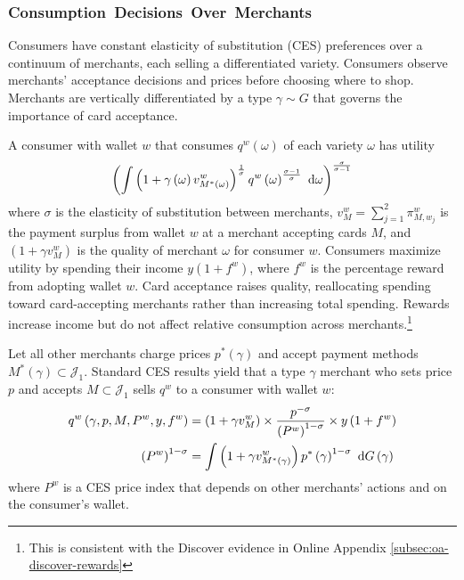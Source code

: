 \documentclass[main.tex]{subfiles}
\begin{document}
\subsubsection{Consumption~Decisions~Over~Merchants}
\label{subsubsec:consumption-over-merchants}

Consumers have constant elasticity of substitution (CES) preferences over a continuum of merchants, each selling a differentiated variety.
Consumers observe merchants' acceptance decisions and prices before choosing where to shop.
Merchants are vertically differentiated by a type $\gamma \sim G$ that governs the importance of card acceptance.

A consumer with wallet $w$ that consumes $q^w\left(\omega\right)$ of each variety $\omega$ has utility
\begin{equation}
\left(\int\left(1+\gamma\left(\omega\right)v_{M^{*}\left(\omega\right)}^{w}\right)^{\frac{1}{\sigma}}q^{w}\left(\omega\right)^{\frac{\sigma-1}{\sigma}}\mbox{ d}\omega\right)^{\frac{\sigma}{\sigma-1}}\label{eq:ces-utility}
\end{equation}
where $\sigma$ is the elasticity of substitution between merchants, $v^{w}_{M}=\sum_{j=1}^{2} \pi^{w}_{M,w_{j}}$ is the payment surplus from wallet $w$ at a merchant accepting cards $M$, and $\left(1+\gamma v^{w}_{M}\right)$ is the quality of merchant $\omega$ for consumer $w$.
Consumers maximize utility by spending their income $y\left(1+f^{w}\right)$, where $f^{w}$ is the percentage reward from adopting wallet $w$.
Card acceptance raises quality, reallocating spending toward card-accepting merchants rather than increasing total spending.
Rewards increase income but do not affect relative consumption across merchants.\footnote{
  This is consistent with the Discover evidence in Online Appendix \ref{subsec:oa-discover-rewards}
}

Let all other merchants charge prices $p^{*}\left(\gamma\right)$ and accept payment methods $M^{*}\left(\gamma\right)\subset\mathcal{J}_{1}$.
Standard CES results yield that a type $\gamma$ merchant who sets price $p$ and accepts $M\subset\mathcal{J}_{1}$ sells $q^{w}$ to a consumer with wallet $w$:
\begin{align}
q^{w}\left(\gamma,p,M,P^{w},y,f^{w}\right) & =\left(1+\gamma v_{M}^{w}\right)\times\frac{p^{-\sigma}}{\left(P^{w}\right)^{1-\sigma}}\times y\left(1+f^{w}\right)\label{eq:consumer-demand-merchant}\\
\left(P^{w}\right)^{1-\sigma} & =\int\left(1+\gamma v_{M^{*}\left(\gamma\right)}^{w}\right)p^{*}\left(\gamma\right)^{1-\sigma}\mbox{ d} G\left(\gamma\right)\label{eq:price-index-integral-gamma}
\end{align}
where $P^{w}$ is a CES price index that depends on other merchants' actions and on the consumer's wallet.
\end{document}
